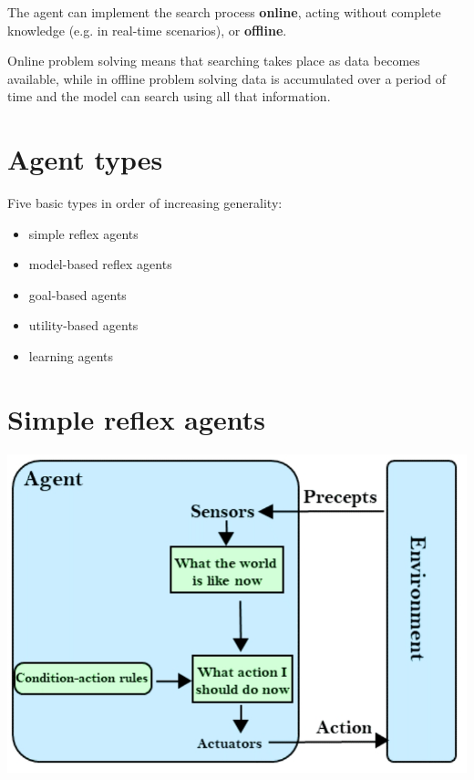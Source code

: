 \documentclass{article}
\begin{document}
The agent can implement the search process \textbf{online}, acting without complete knowledge (e.g. in real-time scenarios), or \textbf{offline}.

Online problem solving means that searching takes place as data becomes available, while in offline problem solving data is accumulated over a period of time and the model can search using all that information. 

\section{Agent types}

Five basic types in order of increasing generality:

\begin{center}
    \begin{itemize}
        \item simple reflex agents
        \item model-based reflex agents
        \item goal-based agents
        \item utility-based agents
        \item learning agents
    \end{itemize}
\end{center}

\newpage

\section{Simple reflex agents}

\begin{center}
    \includegraphics[scale=0.4]{images/simple_relfex_agent.jpg}
\end{center}
\end{document}
